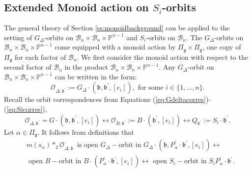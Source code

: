 \documentclass[12pt]{amsart}
\numberwithin{equation}{section}
\theoremstyle{remark}
\newtheorem{rem}[thm]{Remark}
\theoremstyle{definition}
\newcommand{\fg}{\mbox{${\mathfrak g}$}}
\newcommand{\fp}{\mbox{${\mathfrak p}$}}
\newcommand{\fb}{\mbox{${\mathfrak b}$}}
\newcommand{\B}{\mathcal{B}}
\newcommand{\ms}{m(s_{\alpha})}
\begin{document}
\subsection{Extended Monoid action on $S_{i}$-orbits}
The general theory of Section \ref{ss:monoidbackground} can be applied to the setting of $G_{\Delta}$-orbits on 
$\B_{n}\times\B_{n}\times\mathbb{P}^{n-1}$ and $S_{i}$-orbits on $\B_{n}$.  The $G_{\Delta}$-orbits on $\B_{n}\times\B_{n}\times\mathbb{P}^{n-1}$ come equipped with a monoid action by $\Pi_{\fg}\times\Pi_{\fg}$, one copy of $\Pi_{\fg}$ for each factor of $\B_{n}$.  
We first consider the monoid action with respect to the second 
factor of $\B_{n}$ in the product $\B_{n}\times\B_{n}\times\mathbb{P}^{n-1}$.  
Any $G_{\Delta}$-orbit on $\B_{n}\times\B_{n}\times\mathbb{P}^{n-1}$ can be written in the form:
\begin{equation}\label{eq:Gdeltaorbit}
\mathcal{O}_{\Delta,\fb^{\prime}}:=G_{\Delta}\cdot (\fb, \fb^{\prime}, [e_{i}]), \mbox{ for some } i\in\{1,\dots, n\}.
\end{equation}
 Recall the orbit correspondences from Equations (\ref{eq:Gdeltacorres})-(\ref{eq:Sicorres}),
\begin{equation}\label{eq:three}
\mathcal{O}_{\Delta,\fb^{\prime}}=G\cdot (\fb, \fb^{\prime}, [e_{i}])\longleftrightarrow \mathcal{O}_{B,\fb^{\prime}}:=B\cdot (\fb^{\prime}, [e_{i}])\longleftrightarrow Q_{\fb^{\prime}}:=S_{i}\cdot \fb^{\prime}.
\end{equation}
Let $\alpha\in\Pi_{\fg}$. It follows from definitions that 
\begin{equation*}
\begin{split}
&\ms*_{2} \mathcal{O}_{\Delta,\fb^{\prime}} \mbox{ is open } G_{\Delta}-\mbox{orbit in } 
G_{\Delta}\cdot (\fb, P_{\alpha}^{\prime}\cdot \fb^{\prime}, [e_{i}])\longleftrightarrow \\
&\mbox{ open } B-\mbox{orbit in } B\cdot (P_{\alpha}^{\prime}\cdot\fb^{\prime}, [e_{i}])\longleftrightarrow \mbox{ open } S_{i}-\mbox{orbit in } S_{i}P_{\alpha}^{\prime}\cdot\fb^{\prime}. 
\end{split}
\end{equation*}
\end{document}
